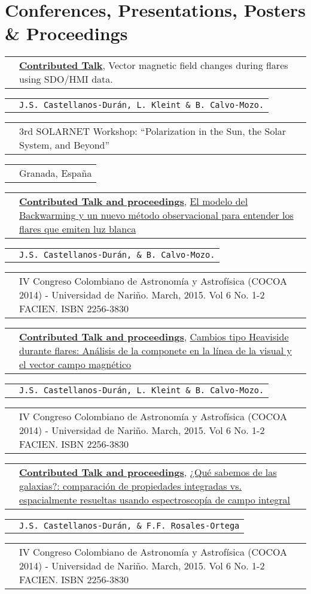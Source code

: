 \documentclass[11pt,letterpaper,sans]{moderncv}        %
\makeatletter
\renewcommand*{\cvitem}[3][.25em]{%
  \begin{tabular}{@{}p{\hintscolumnwidth}@{\hspace{\separatorcolumnwidth}}p{\maincolumnwidth}@{}}%
      \raggedleft\hintstyle{#2} &{#3}%
  \end{tabular}%
  \par\addvspace{#1}}
\makeatother
\begin{document}
\section{Conferences, Presentations, Posters \& Proceedings}
\cvitem{May 25-28, 2015}{\href{http://spg.iaa.es/Workshop}{\textbf{Contributed Talk}}, Vector magnetic field changes during flares using SDO/HMI data.}
\cvitem{2015}{\texttt{J.S. Castellanos-Dur\'an, L. Kleint \& B. Calvo-Mozo.}}
\cvitem{}{3rd SOLARNET Workshop: ``Polarization in the Sun, the Solar System, and Beyond''}
\cvitem{}{Granada, España}
\cvitem{Dec 1 - 5 2014}{\href{http://aulavirtual.udenar.edu.co/cocoa/}{\textbf{Contributed Talk and proceedings}}, \href{http://aulavirtual.udenar.edu.co/cocoa/wp-content/uploads/2014/12/Resumenes-IV-COCOA-2014.pdf}{El modelo del Backwarming y un nuevo método observacional para entender los flares que emiten luz blanca} }
\cvitem{}{\texttt{J.S. Castellanos-Dur\'an,  \& B. Calvo-Mozo.}}
\cvitem{}{IV Congreso Colombiano de Astronom\'{i}a y Astrof\'{i}sica (COCOA 2014) - Universidad de Nariño. March, 2015. Vol 6 No. 1-2 FACIEN.  ISBN 2256-3830}
\cvitem{Dec 1 - 5 2014}{\href{http://aulavirtual.udenar.edu.co/cocoa/}{\textbf{Contributed Talk and proceedings}}, \href{http://aulavirtual.udenar.edu.co/cocoa/wp-content/uploads/2014/12/Resumenes-IV-COCOA-2014.pdf}{Cambios tipo Heaviside durante flares: Análisis de la componete en la línea de la visual y el vector campo magnético} }
\cvitem{}{\texttt{J.S. Castellanos-Dur\'an, L. Kleint \& B. Calvo-Mozo.}}
\cvitem{}{IV Congreso Colombiano de Astronom\'{i}a y Astrof\'{i}sica (COCOA 2014) - Universidad de Nariño. March, 2015. Vol 6 No. 1-2 FACIEN. ISBN 2256-3830}
\cvitem{Dec 1 - 5 2014}{\href{http://aulavirtual.udenar.edu.co/cocoa/}{\textbf{Contributed Talk and proceedings}}, \href{http://aulavirtual.udenar.edu.co/cocoa/wp-content/uploads/2014/12/Resumenes-IV-COCOA-2014.pdf}{¿Qu\'e sabemos de las galaxias?: comparaci\'on de propiedades integradas vs. espacialmente
resueltas usando espectroscop\'{i}a de campo integral} }
\cvitem{}{\texttt{J.S. Castellanos-Dur\'an,  \& F.F. Rosales-Ortega}}
\cvitem{}{IV Congreso Colombiano de Astronom\'{i}a y Astrof\'{i}sica (COCOA 2014) - Universidad de Nariño. March, 2015. Vol 6 No. 1-2 FACIEN.  ISBN 2256-3830}
\end{document}
